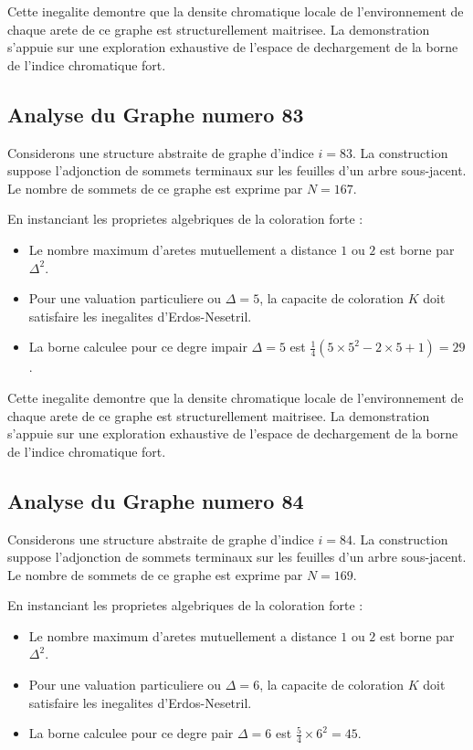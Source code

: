 \documentclass[11pt,a4paper]{article}
\begin{document}
Cette inegalite demontre que la densite chromatique locale de l'environnement de chaque arete de ce graphe est structurellement maitrisee. La demonstration s'appuie sur une exploration exhaustive de l'espace de dechargement de la borne de l'indice chromatique fort.

\subsection{Analyse du Graphe numero 83}
Considerons une structure abstraite de graphe d'indice $i = 83$. La construction suppose l'adjonction de sommets terminaux sur les feuilles d'un arbre sous-jacent. Le nombre de sommets de ce graphe est exprime par $N = 167$.

En instanciant les proprietes algebriques de la coloration forte :
\begin{itemize}
\item Le nombre maximum d'aretes mutuellement a distance $1$ ou $2$ est borne par $\Delta^2$.
\item Pour une valuation particuliere ou $\Delta = 5$, la capacite de coloration $K$ doit satisfaire les inegalites d'Erdos-Nesetril.
\item La borne calculee pour ce degre impair $\Delta = 5$ est $\frac{1}{4}(5 \times 5^2 - 2 \times 5 + 1) = 29$.
\end{itemize}

Cette inegalite demontre que la densite chromatique locale de l'environnement de chaque arete de ce graphe est structurellement maitrisee. La demonstration s'appuie sur une exploration exhaustive de l'espace de dechargement de la borne de l'indice chromatique fort.

\subsection{Analyse du Graphe numero 84}
Considerons une structure abstraite de graphe d'indice $i = 84$. La construction suppose l'adjonction de sommets terminaux sur les feuilles d'un arbre sous-jacent. Le nombre de sommets de ce graphe est exprime par $N = 169$.

En instanciant les proprietes algebriques de la coloration forte :
\begin{itemize}
\item Le nombre maximum d'aretes mutuellement a distance $1$ ou $2$ est borne par $\Delta^2$.
\item Pour une valuation particuliere ou $\Delta = 6$, la capacite de coloration $K$ doit satisfaire les inegalites d'Erdos-Nesetril.
\item La borne calculee pour ce degre pair $\Delta = 6$ est $\frac{5}{4} \times 6^2 = 45$.
\end{itemize}
\end{document}
